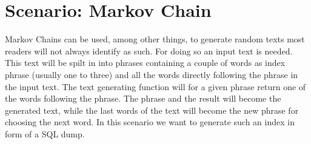 \section{Scenario: Markov Chain} 

Markov Chains can be used, among other things, to generate random texts most readers will not always identify as such. For doing so an input text is needed. This text will be spilt in into phrases containing a couple of words as index phrase (usually one to three) and all the words directly following the phrase in the input text. The text generating function will for a given phrase return one of the words following the phrase. The phrase and the result will become the generated text, while the last words of the text will become the new phrase for choosing the next word. In this scenario we want to generate such an index in form of a SQL dump.